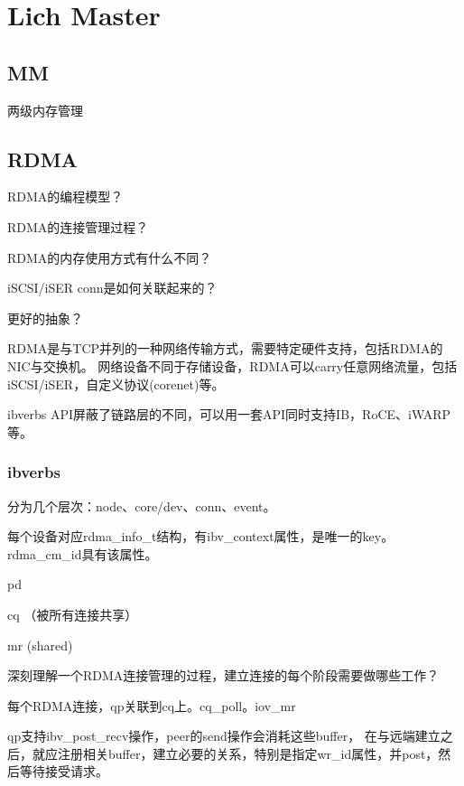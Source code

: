 \chapter{Lich Master}

\section{MM}

两级内存管理

\section{RDMA}

\begin{enumbox}
\item RDMA的编程模型？
\item RDMA的连接管理过程？
\item RDMA的内存使用方式有什么不同？
\item iSCSI/iSER conn是如何关联起来的？
\item 更好的抽象？
\end{enumbox}

RDMA是与TCP并列的一种网络传输方式，需要特定硬件支持，包括RDMA的NIC与交换机。
网络设备不同于存储设备，RDMA可以carry任意网络流量，包括iSCSI/iSER，自定义协议(corenet)等。

ibverbs API屏蔽了链路层的不同，可以用一套API同时支持IB，RoCE、iWARP等。

\subsection{ibverbs}

分为几个层次：node、core/dev、conn、event。

每个设备对应rdma\_info\_t结构，有ibv\_context属性，是唯一的key。rdma\_cm\_id具有该属性。

\begin{itembox}
\item pd
\item cq （被所有连接共享）
\item mr  (shared)
\end{itembox}

深刻理解一个RDMA连接管理的过程，建立连接的每个阶段需要做哪些工作？

每个RDMA连接，qp关联到cq上。cq\_poll。iov\_mr

qp支持ibv\_post\_recv操作，peer的send操作会消耗这些buffer，
在与远端建立之后，就应注册相关buffer，建立必要的关系，特别是指定wr\_id属性，并post，然后等待接受请求。


